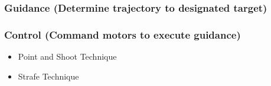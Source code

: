 \subsubsection{Guidance (Determine trajectory to designated target)}
\label{guidancedeterminetrajectorytodesignatedtarget}

\subsubsection{Control (Command motors to execute guidance)}
\label{controlcommandmotorstoexecuteguidance}

\begin{itemize}
\item Point and Shoot Technique

\item Strafe Technique

\end{itemize}



